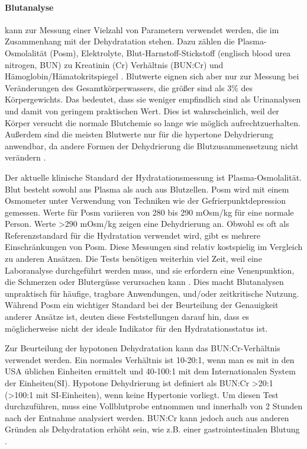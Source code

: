 \documentclass[10pt,a4paper,headinclude,twoside, plainheadsepline, open=right, numbers=noenddot, twocolumn]{article}
\begin{document}
\paragraph{Blutanalyse} kann zur Messung einer Vielzahl von Parametern verwendet werden, die im Zusammenhang mit der Dehydratation stehen.
Dazu zählen die Plasma-Osmolalität (Posm), Elektrolyte, Blut-Harnstoff-Stickstoff (englisch blood urea nitrogen, BUN) zu Kreatinin (Cr) Verhältnis (BUN:Cr) und Hämoglobin/Hämatokritspiegel \cite{oppliger2002hydration}.
Blutwerte eignen sich aber nur zur Messung bei Veränderungen des Gesamtkörperwassers, die größer sind als 3\% des Körpergewichts.
Das bedeutet, dass sie weniger empfindlich sind als Urinanalysen und damit von geringem praktischen Wert.
Dies ist wahrscheinlich, weil der Körper versucht die normale Blutchemie so lange wie möglich aufrechtzuerhalten.
Außerdem sind die meisten Blutwerte nur für die hypertone Dehydrierung anwendbar, da andere Formen der Dehydrierung die Blutzusammensetzung nicht verändern \cite{garret2018engineering}.

Der aktuelle klinische Standard der Hydratationsmessung ist Plasma-Osmolalität.
Blut besteht sowohl aus Plasma als auch aus Blutzellen.
Posm wird mit einem Osmometer unter Verwendung von Techniken wie der Gefrierpunktdepression gemessen.
Werte für Posm variieren von 280 bis 290 mOsm/kg für eine normale Person.
Werte >290 mOsm/kg zeigen eine Dehydrierung an.
Obwohl es oft als Referenzstandard für die Hydratation verwendet wird, gibt es mehrere Einschränkungen von Posm.
Diese Messungen sind relativ kostspielig im Vergleich zu anderen Ansätzen.
Die Tests benötigen weiterhin viel Zeit, weil eine Laboranalyse durchgeführt werden muss, und sie erfordern eine Venenpunktion, die Schmerzen oder Blutergüsse verursachen kann \cite{armstrong1994urinary}. 
Dies macht Blutanalysen unpraktisch für häufige, tragbare Anwendungen, und/oder zeitkritische Nutzung. 
Während Posm ein wichtiger Standard bei der Beurteilung der Genauigkeit anderer Ansätze ist, deuten diese Feststellungen darauf hin, dass es möglicherweise nicht der ideale Indikator für den Hydratationsstatus ist\cite{garret2018engineering}.

Zur Beurteilung der hypotonen Dehydratation kann das BUN:Cr-Verhältnis verwendet werden. 
Ein normales Verhältnis ist 10-20:1, wenn man es mit in den USA üblichen Einheiten ermittelt und 40-100:1 mit dem Internationalen System der Einheiten(SI).
Hypotone Dehydrierung ist definiert als BUN:Cr >20:1 (>100:1 mit SI-Einheiten), wenn keine Hypertonie vorliegt.
Um diesen Test durchzuführen, muss eine Vollblutprobe entnommen und innerhalb von 2 Stunden nach der Entnahme analysiert werden.
BUN:Cr kann jedoch auch aus anderen Gründen als Dehydratation erhöht sein, wie z.B. einer gastrointestinalen Blutung \cite{garret2018engineering}.
\end{document}
